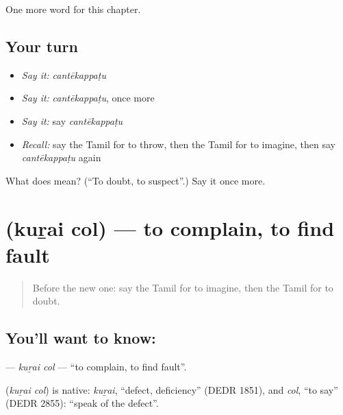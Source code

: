 \begin{grammarlens}[title={What you've built}]
One more word for this chapter.
\end{grammarlens}

\subsection*{Your turn}
\begin{itemize}
\raggedright
  \item \emph{Say it:} \emph{cantēkappaṭu}
  \item \emph{Say it:} \emph{cantēkappaṭu}, once more
  \item \emph{Say it:} say \emph{cantēkappaṭu}
  \item \emph{Recall:} say the Tamil for to throw, then the Tamil for to imagine, then say \emph{cantēkappaṭu} again
\end{itemize}

\begin{tcolorbox}[breakable,colback=teal!4,colframe=teal!35!black,title={Before you move on}]
What does  mean? (\textquotedblleft{}To doubt, to suspect\textquotedblright{}.) Say it once more.
\end{tcolorbox}
\section[\texorpdfstring{\ta{குறை} \ta{சொல்} (kuṟai col)}{குறை சொல் (kuṟai col)}]{  (kuṟai col) — to complain, to find fault}

\label{lesson:TA-C230-kurai-col}



\begin{quote}
Before the new one: say the Tamil for to imagine, then the Tamil for to doubt.
\end{quote}

\subsection*{You'll want to know:  }
\textbf{ } — \emph{kuṟai col} — \textquotedblleft{}to complain, to find fault\textquotedblright{}.

\begin{cousinweb}
\textbf{ } (\emph{kuṟai col}) is native: \emph{kuṟai}, \textquotedblleft{}defect, deficiency\textquotedblright{} (DEDR 1851), and \emph{col}, \textquotedblleft{}to say\textquotedblright{} (DEDR 2855): \textquotedblleft{}speak of the defect\textquotedblright{}.
\end{cousinweb}

